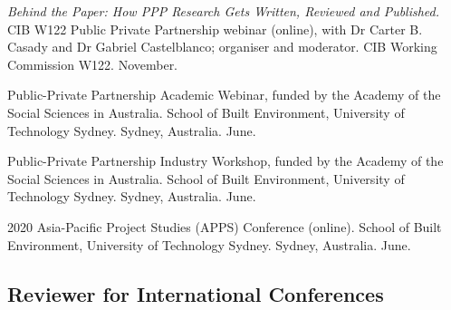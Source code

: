 \documentclass[11pt,a4paper]{report} %
\begin{document}
    \begin{tablist}

        \item[2026] \tab{}\textit{Behind the Paper: How PPP Research Gets Written, Reviewed and Published.} CIB W122 Public Private Partnership webinar (online), with Dr Carter B. Casady and Dr Gabriel Castelblanco; organiser and moderator. CIB Working Commission W122. November.

        \item[2021] \tab{}Public-Private Partnership Academic Webinar, funded by the Academy of the Social Sciences in Australia. School of Built Environment, University of Technology Sydney. Sydney, Australia. June.

        \item[2021] \tab{}Public-Private Partnership Industry Workshop, funded by the Academy of the Social Sciences in Australia. School of Built Environment, University of Technology Sydney. Sydney, Australia. June.

        \item[2020] \tab{}2020 Asia-Pacific Project Studies (APPS) Conference (online). School of Built Environment, University of Technology Sydney. Sydney, Australia. June.

    \end{tablist}

    \subsection*{Reviewer for International Conferences}
\end{document}
